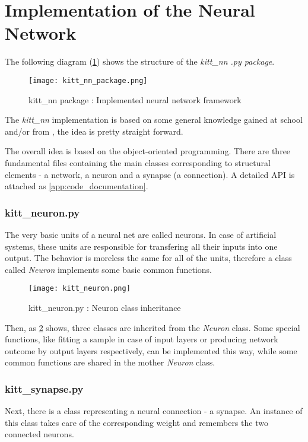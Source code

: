 \section{Implementation of the Neural Network} \label{sec:implementation_of_nn}
The following diagram (\ref{img:kitt_nn_package}) shows the structure of the \textit{kitt\_nn .py package}.

\begin{figure}[H]
  \centering
  \texttt{[image: kitt\_nn\_package.png]}
  \caption{kitt\_nn package : Implemented neural network framework}
  \label{img:kitt_nn_package}
\end{figure}

The \textit{kitt\_nn} implementation is based on some general knowledge gained at school and/or from \citep{online:nn_demystified}, the idea is pretty straight forward.

The overall idea is based on the object-oriented programming. There are three fundamental files containing the main classes corresponding to structural elements - a network, a neuron and a synapse (a connection). A detailed API is attached as \cref{app:code_documentation}.

\subsubsection*{kitt\_neuron.py} \label{ssec:kitt_neuron}
The very basic units of a neural net are called neurons. In case of artificial systems, these units are responsible for transfering all their inputs into one output. The behavior is moreless the same for all of the units, therefore a class called \textit{Neuron} implements some basic common functions.

\begin{figure}[H]
  \centering
  \texttt{[image: kitt\_neuron.png]}
  \caption{kitt\_neuron.py : Neuron class inheritance}
  \label{img:kitt_neuron}
\end{figure}

Then, as \cref{img:kitt_neuron} shows, three classes are inherited from the \textit{Neuron} class. Some special functions, like fitting a sample in case of input layers or producing network outcome by output layers respectively, can be implemented this way, while some common functions are shared in the mother \textit{Neuron} class.

\subsubsection*{kitt\_synapse.py} \label{ssec:kitt_synapse}
Next, there is a class representing a neural connection - a synapse. An instance of this class takes care of the corresponding weight and remembers the two connected neurons. 


